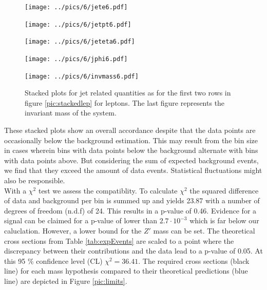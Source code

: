 \begin{figure}[H]
\begin{minipage}{\minwidththree\textwidth}
 \texttt{[image: ../pics/6/jete6.pdf]}
\end{minipage}
\begin{minipage}{\minwidththree\textwidth}
 \texttt{[image: ../pics/6/jetpt6.pdf]}
\end{minipage}


\begin{minipage}{\minwidththree\textwidth}
 \texttt{[image: ../pics/6/jeteta6.pdf]}
\end{minipage}
\begin{minipage}{\minwidththree\textwidth}
 \texttt{[image: ../pics/6/jphi6.pdf]}
\end{minipage}


\begin{minipage}{0.8\textwidth}
 \texttt{[image: ../pics/6/invmass6.pdf]}
\end{minipage}
\caption{\small{Stacked plots for jet related quantities as for the first two rows in figure \ref{pic:stackedlep} for leptons. The last figure represents
the invariant mass of the system. }}
\label{pic:stackedjet} 
\end{figure}
These stacked plots show an overall accordance despite that the data points are occasionally below the background estimation. This may result from 
the bin size in cases wherein bins with data points below the background alternate with bins with data points above. But considering the sum of
expected background events, we find that they exceed the amount of data events. Statistical fluctuations might also be responsible.\\
\noindent With a $\chi^2$ test we assess the compatiblity. To calculate $\chi^2$ the squared difference of data and background per bin is summed up
and yields 23.87 with a number of degrees of freedom (n.d.f) of 24. This results in a p-value of 0.46. Evidence for a signal can be claimed
for a p-value of lower than $2.7\cdot 10^{-3}$ which is far below our caluclation. However, a lower bound for the $Z'$ mass can be set. The 
theoretical cross sections from Table \ref{tab:expEvents} are scaled to a point where the discrepancy between their contributions and the data
lead to a p-value of 0.05. At this 95 \% confidence level (CL) $\chi^2 = 36.41$. The required cross sections (black line) for each mass hypothesis 
compared to their theoretical predictions (blue line) are depicted in Figure \ref{pic:limits}.
